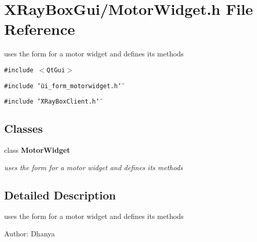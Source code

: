 \section{XRay\-Box\-Gui/Motor\-Widget.h File Reference}
\label{MotorWidget_8h}
uses the form for a motor widget and defines its methods 

{\tt \#include $<$Qt\-Gui$>$}\par
{\tt \#include \char`\"{}ui\_\-form\_\-motorwidget.h\char`\"{}}\par
{\tt \#include \char`\"{}XRay\-Box\-Client.h\char`\"{}}\par
\subsection*{Classes}
\begin{CompactItemize}
\item 
class \bf{Motor\-Widget}
\begin{CompactList}\small\item\em uses the form for a motor widget and defines its methods \item\end{CompactList}\end{CompactItemize}


\subsection{Detailed Description}
uses the form for a motor widget and defines its methods 

\begin{Desc}
\item[Author:]Dhanya \end{Desc}
